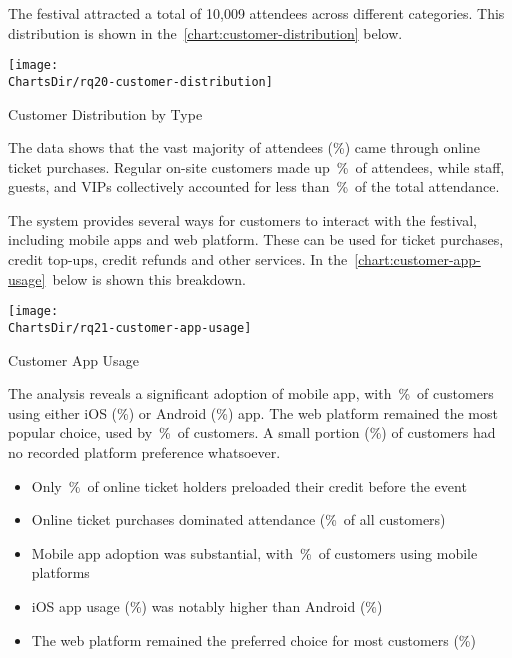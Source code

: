
The festival attracted a total of 10,009 attendees across different categories.
This distribution is shown in the~\autoref{chart:customer-distribution} below.

\begin{chart}[H]
	\centering
	\texttt{[image: \\ChartsDir/rq20-customer-distribution]}
	\caption{ Customer Distribution by Type}
	\label{chart:customer-distribution}
	\source
\end{chart}

The data shows that the vast majority of attendees (\%) came through online ticket purchases.
Regular on-site customers made up~\%~of attendees, while staff, guests, and VIPs collectively accounted for less than~\%~of the total attendance.


The system provides several ways for customers to interact with the festival, including mobile apps and web platform.
These can be used for ticket purchases, credit top-ups, credit refunds and other services.
In the~\autoref{chart:customer-app-usage}~below is shown this breakdown.

\begin{chart}[H]
	\centering
	\texttt{[image: \\ChartsDir/rq21-customer-app-usage]}
	\caption{ Customer App Usage}
	\label{chart:customer-app-usage}
	\source
\end{chart}

The analysis reveals a significant adoption of mobile app, with~\%~of customers using either iOS (\%) or Android (\%) app.
The web platform remained the most popular choice, used by~\%~of customers.
A small portion (\%) of customers had no recorded platform preference whatsoever.

\begin{keytakeaways}
	\begin{itemize}
		\item Only~\%~of online ticket holders preloaded their credit before the event
		\item Online ticket purchases dominated attendance (\%~of all customers)
		\item Mobile app adoption was substantial, with~\%~of customers using mobile platforms
		\item iOS app usage (\%) was notably higher than Android (\%)
		\item The web platform remained the preferred choice for most customers (\%)
	\end{itemize}
\end{keytakeaways}



